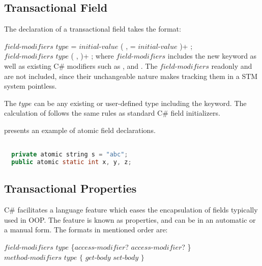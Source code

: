 \subsection{Transactional Field}
The declaration of a transactional field takes the format:

$field$-$modifiers$ $type$  = $initial$-$value$ ( ,  = $initial$-$value$ )+ ; \\
$field$-$modifiers$ $type$  ( ,  )+ ;
where $field$-$modifiers$ includes the new  keyword as well as existing C\# modifiers such as ,  and . The $field$-$modifiers$ {readonly} and  are not included, since their unchangeable nature makes tracking them in a \ac{STM} system pointless.

The $type$ can be any existing or user-defined type including the  keyword. The calculation of  follows the same rules as standard C\# field initializers\cite[p. 40]{sestoft2011c}.

 presents an example of atomic field declarations.

\begin{lstlisting}[label=lst:design_transactional_fields,
  caption={Local Transactional Variable},
  language=Java,  
  showspaces=false,
  showtabs=false,
  breaklines=true,
  showstringspaces=false,
  breakatwhitespace=true,
  commentstyle=\color{greencomments},
  keywordstyle=\color{bluekeywords},
  stringstyle=\color{redstrings},
  morekeywords={atomic, retry, orElse, var, get, set}]  % Start your code-block

  private atomic string s = "abc";
  public atomic static int x, y, z;
\end{lstlisting}

\subsection{Transactional Properties}\label{subsec:design_properties}
C\# facilitates a language feature which eases the encapsulation of fields typically used in \ac{OOP}. The feature is known as properties, and can be in an automatic or a manual form. The formats in mentioned order are\cite[p. 52]{sestoft2011c}:

$field$-$modifiers$ $type$  \{$access$-$modifier$? \bscode{;} $access$-$modifier$? \bscode{;} \}\\
$method$-$modifiers$ $type$  $\{$  $get$-$body$  $set$-$body$ $\}$


